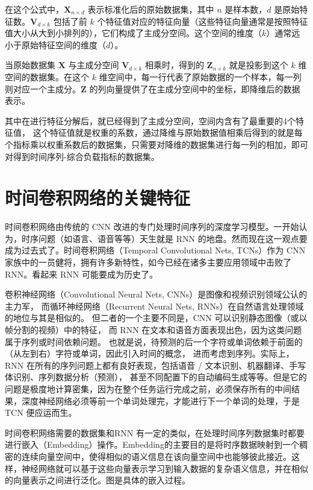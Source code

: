 在这个公式中，$\mathbf{X}_{n \times d}$ 表示标准化后的原始数据集，其中 $n$ 是样本数，$d$ 是原始特征数。$\mathbf{V}_{d \times k}$ 包括了前 $k$ 个特征值对应的特征向量（这些特征向量通常是按照特征值大小从大到小排列的），它们构成了主成分空间。这个空间的维度（$k$）通常远小于原始特征空间的维度（$d$）。

当原始数据集 $\mathbf{X}$ 与主成分空间 $\mathbf{V}_{d \times k}$ 相乘时，得到的 $\mathbf{Z}_{n \times k}$ 就是投影到这个 $k$ 维空间的数据集。在这个 $k$ 维空间中，每一行代表了原始数据的一个样本，每一列则对应一个主成分。$\mathbf{Z}$ 的列向量提供了在主成分空间中的坐标，即降维后的数据表示。

其中在进行特征分解后，就已经得到了主成分空间，空间内含有了最重要的4个特征值，
这个特征值就是权重的系数，通过降维与原始数据值相乘后得到的就是每个指标乘以权重系数后的数据集，只需要对降维的数据集进行每一列的相加，即可对得到时间序列-综合负载指标的数据集。

\section{时间卷积网络的关键特征}
时间卷积网络由传统的 CNN 改进的专门处理时间序列的深度学习模型\cite{lea2016temporal}。一开始认为，时序问题（如语言、语音等等）天生就是 RNN 的地盘。然而现在这一观点要成为过去式了。时间卷积网络（Temporal Convolutional Nets, TCNs）作为 CNN 家族中的一员健将，拥有许多新特性，如今已经在诸多主要应用领域中击败了 RNN。看起来 RNN 可能要成为历史了。

卷积神经网络（Convolutional Neural Nets, CNNs）是图像和视频识别领域公认的主力军，
而循环神经网络（Recurrent Neural Nets, RNNs）在自然语言处理领域的地位与其是相似的。
但二者的一个主要不同是，CNN 可以识别静态图像（或以帧分割的视频）中的特征，
而 RNN 在文本和语音方面表现出色，因为这类问题属于序列或时间依赖问题。
也就是说，待预测的后一个字符或单词依赖于前面的（从左到右）字符或单词，因此引入时间的概念，
进而考虑到序列。实际上，RNN 在所有的序列问题上都有良好表现，包括语音 / 文本识别、机器翻译、手写体识别、序列数据分析（预测），
甚至不同配置下的自动编码生成等等。但是它的问题是极度地计算密集，因为在整个任务运行完成之前，必须保存所有的中间结果，深度神经网络必须等前一个单词处理完，才能进行下一个单词的处理，于是 TCN 便应运而生。

时间卷积网络需要的数据集和RNN 有一定的类似，在处理时间序列数据集时都要进行嵌入（Embedding）操作。Embedding的主要目的是将时序数据映射到一个稠密的连续向量空间中，使得相似的语义信息在该向量空间中也能够彼此接近。这样，神经网络就可以基于这些向量表示学习到输入数据的复杂语义信息，并在相似的向量表示之间进行泛化。图是具体的嵌入过程。


